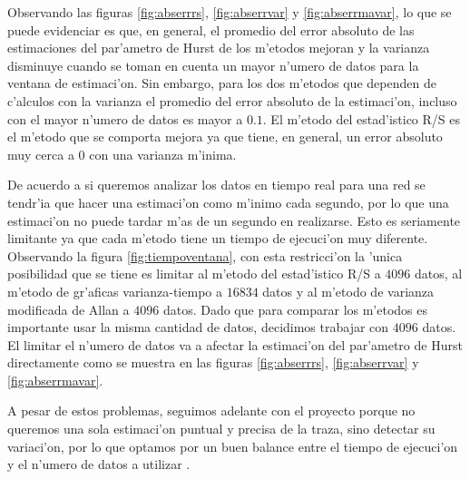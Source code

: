 Observando las figuras \ref{fig:abserrrs}, \ref{fig:abserrvar} y
\ref{fig:abserrmavar}, lo que se puede evidenciar es que, en general, el
promedio del error absoluto de las estimaciones del par'ametro de Hurst de los
m'etodos mejoran y la varianza disminuye cuando se toman en cuenta un mayor
n'umero de datos para la ventana de estimaci'on. Sin embargo, para los
dos m'etodos que dependen de c'alculos con la varianza el promedio del error 
absoluto de la estimaci'on, incluso con el mayor n'umero de datos es mayor a
$0.1$. El m'etodo del estad'istico R/S es el m'etodo que se comporta mejora 
ya que tiene, en general, un error absoluto muy cerca a $0$ con una varianza
m'inima. 

De acuerdo a \cite{intelligentfuzzy} si queremos analizar los datos en tiempo
real para una red se tendr'ia que hacer una estimaci'on como m'inimo cada
segundo, por lo que una estimaci'on no puede tardar m'as de un segundo en
realizarse. Esto es seriamente limitante ya que cada m'etodo tiene un tiempo de
ejecuci'on muy diferente. Observando la figura \ref{fig:tiempoventana}, con
esta restricci'on la 'unica posibilidad que se tiene es limitar al m'etodo del
estad'istico R/S a $4096$ datos, al m'etodo de gr'aficas varianza-tiempo a
$16834$ datos y al m'etodo de varianza modificada de Allan a $4096$ datos. Dado
que para comparar los m'etodos es importante usar la misma cantidad de datos,
decidimos trabajar con $4096$ datos. El limitar el n'umero de datos va a
afectar la estimaci'on del par'ametro de Hurst directamente como se muestra en
las figuras \ref{fig:abserrrs}, \ref{fig:abserrvar} y \ref{fig:abserrmavar}. 

A pesar de estos problemas, seguimos adelante con el proyecto porque no
queremos una sola estimaci'on puntual y precisa de la traza, sino detectar su
variaci'on, por lo que optamos por un buen balance entre el tiempo de
ejecuci'on y el n'umero de datos a utilizar \cite{intelligentfuzzy}.


